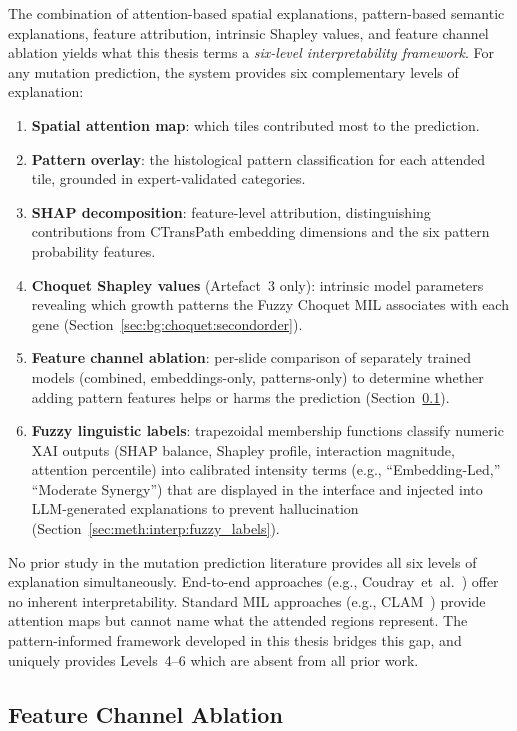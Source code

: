 The combination of attention-based spatial explanations, pattern-based semantic explanations, feature attribution, intrinsic Shapley values, and feature channel ablation yields what this thesis terms a \emph{six-level interpretability framework}.
For any mutation prediction, the system provides six complementary levels of explanation:
\begin{enumerate}
    \item \textbf{Spatial attention map}: which tiles contributed most to the prediction.
    \item \textbf{Pattern overlay}: the histological pattern classification for each attended tile, grounded in expert-validated categories.
    \item \textbf{SHAP decomposition}: feature-level attribution, distinguishing contributions from CTransPath embedding dimensions and the six pattern probability features.
    \item \textbf{Choquet Shapley values} (Artefact~3 only): intrinsic model parameters revealing which growth patterns the Fuzzy Choquet MIL associates with each gene (Section~\ref{sec:bg:choquet:secondorder}).
    \item \textbf{Feature channel ablation}: per-slide comparison of separately trained models (combined, embeddings-only, patterns-only) to determine whether adding pattern features helps or harms the prediction (Section~\ref{sec:bg:channel_ablation}).
    \item \textbf{Fuzzy linguistic labels}: trapezoidal membership functions classify numeric XAI outputs (SHAP balance, Shapley profile, interaction magnitude, attention percentile) into calibrated intensity terms (e.g., ``Embedding-Led,'' ``Moderate Synergy'') that are displayed in the interface and injected into LLM-generated explanations to prevent hallucination (Section~\ref{sec:meth:interp:fuzzy_labels}).
\end{enumerate}

No prior study in the mutation prediction literature provides all six levels of explanation simultaneously.
End-to-end approaches (e.g., Coudray~et~al.~\cite{coudray2018classification}) offer no inherent interpretability.
Standard MIL approaches (e.g., CLAM~\cite{lu2021data}) provide attention maps but cannot name what the attended regions represent.
The pattern-informed framework developed in this thesis bridges this gap, and uniquely provides Levels~4--6 which are absent from all prior work.

\subsection{Feature Channel Ablation}
\label{sec:bg:channel_ablation}

